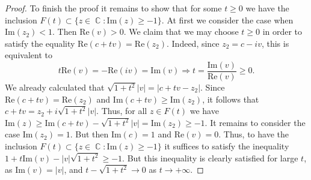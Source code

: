 \documentclass{amsart}
\numberwithin{equation}{section}
\theoremstyle{definition}
\theoremstyle{remark}
\DeclareMathOperator{\CC}{\mathbb C}
\begin{document}
\begin{proof}
		To finish the proof it remains to show that for some $t \ge 0$ we have the inclusion $F(t) \subset \{z \in \CC: \mathrm{Im}(z) \ge -1\}$. At first we consider the case when $\mathrm{Im}(z_2) < 1$. Then $\mathrm{Re}(v) > 0$. We claim that we may choose $t \ge 0$ in order to satisfy the equality $\mathrm{Re}(c + tv) = \mathrm{Re}(z_2)$. Indeed, since $z_2 = c - iv$, this is equivalent to
		\[
		t\mathrm{Re}(v) = -\mathrm{Re}(iv) = \mathrm{Im}(v) \Rightarrow t = \dfrac{\mathrm{Im}(v)}{\mathrm{Re}(v)} \ge 0.
		\]
		We already calculated that $\sqrt{1 + t^2}|v| = |c + tv - z_2|$. Since $\mathrm{Re}(c + tv) = \mathrm{Re}(z_2)$ and $\mathrm{Im}(c + tv) \ge \mathrm{Im}(z_2)$, it follows that $c + tv = z_2 + i\sqrt{1 + t^2} |v|$. Thus, for all $z \in F(t)$ we have $\mathrm{Im}(z) \ge \mathrm{Im}(c + tv) - \sqrt{1 + t^2} |v| = \mathrm{Im}(z_2) \ge -1$. It remains to consider the case $\mathrm{Im}(z_2) = 1$. But then $\mathrm{Im}(c) = 1$ and $\mathrm{Re}(v) = 0$. Thus, to have the inclusion $F(t) \subset \{z \in \CC: \mathrm{Im}(z) \ge -1\}$ it suffices to satisfy the inequality $1 + t \mathrm{Im}(v) - |v|\sqrt{1 + t^2} \ge -1$. But this inequality is clearly satisfied for large $t$, as $\mathrm{Im}(v) = |v|$, and $t - \sqrt{1 + t^2} \to 0$ as $t \to +\infty$.
	\end{proof}
	
\end{document}
